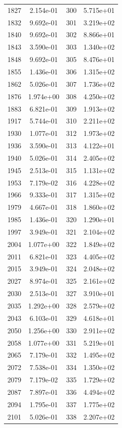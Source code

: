 \documentclass[12pt]{article}
\begin{document}
\begin{longtable}{@{}cccc@{}}
1827 & 2.154e-01 & 300 & 5.715e+01 \\
1832 & 9.692e-01 & 301 & 3.219e+02 \\
1840 & 9.692e-01 & 302 & 8.866e+01 \\
1843 & 3.590e-01 & 303 & 1.340e+02 \\
1848 & 9.692e-01 & 305 & 8.476e+01 \\
1855 & 1.436e-01 & 306 & 1.315e+02 \\
1862 & 5.026e-01 & 307 & 1.736e+02 \\
1876 & 1.974e+00 & 308 & 4.250e+02 \\
1883 & 6.821e-01 & 309 & 1.913e+02 \\
1917 & 5.744e-01 & 310 & 2.211e+02 \\
1930 & 1.077e-01 & 312 & 1.973e+02 \\
1936 & 3.590e-01 & 313 & 4.122e+01 \\
1940 & 5.026e-01 & 314 & 2.405e+02 \\
1945 & 2.513e-01 & 315 & 1.131e+02 \\
1953 & 7.179e-02 & 316 & 4.228e+02 \\
1966 & 9.333e-01 & 317 & 1.315e+02 \\
1979 & 4.667e-01 & 318 & 1.860e+02 \\
1985 & 1.436e-01 & 320 & 1.290e+01 \\
1997 & 3.949e-01 & 321 & 2.104e+02 \\
2004 & 1.077e+00 & 322 & 1.849e+02 \\
2011 & 6.821e-01 & 323 & 4.405e+02 \\
2015 & 3.949e-01 & 324 & 2.048e+02 \\
2027 & 8.974e-01 & 325 & 2.161e+02 \\
2030 & 2.513e-01 & 327 & 3.910e+01 \\
2035 & 1.292e+00 & 328 & 2.579e+02 \\
2043 & 6.103e-01 & 329 & 4.618e+01 \\
2050 & 1.256e+00 & 330 & 2.911e+02 \\
2058 & 1.077e+00 & 331 & 5.219e+01 \\
2065 & 7.179e-01 & 332 & 1.495e+02 \\
2072 & 7.538e-01 & 334 & 1.350e+02 \\
2079 & 7.179e-02 & 335 & 1.729e+02 \\
2087 & 7.897e-01 & 336 & 4.494e+02 \\
2094 & 1.795e-01 & 337 & 1.775e+02 \\
2101 & 5.026e-01 & 338 & 2.207e+02 \\

\end{longtable}
\end{document}
